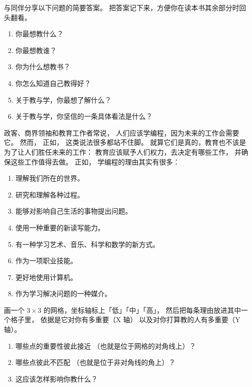 
与同伴分享以下问题的简要答案。
把答案记下来，方便你在读本书其余部分时回头翻看。

\begin{enumerate}

\item
  你最想教什么？

\item
  你最想教谁？

\item
  你为什么想教书？

\item
  你怎么知道自己教得好？

\item
  关于教与学，你最想了解什么？

\item
  关于教与学，你坚信的一条具体看法是什么？

\end{enumerate}


政客、商界领袖和教育工作者常说，
人们应该学编程，因为未来的工作会需要它。
然而，
正如，
这类说法很多都站不住脚。
就算它们是真的，教育也不该是为了让人们胜任未来的工作：
教育应该赋予人们权力，去决定有哪些工作，
并确保这些工作值得去做。
正如，
学编程的理由其实有很多：

\begin{enumerate}

\item
  理解我们所在的世界。

\item
  研究和理解各种过程。

\item
  能够对影响自己生活的事物提出问题。

\item
  使用一种重要的新读写能力。

\item
  有一种学习艺术、音乐、科学和数学的新方式。

\item
  作为一项职业技能。

\item
  更好地使用计算机。

\item
  作为学习解决问题的一种媒介。

\end{enumerate}

画一个 $3{\times}3$ 的网格，坐标轴标上「低」「中」「高」，
然后把每条理由放进其中一个格子里，
依据是它对你有多重要（X 轴）
以及对你打算教的人有多重要（Y 轴）。

\begin{enumerate}

\item
  哪些点的重要性彼此接近
  （也就是位于网格的对角线上）？

\item
  哪些点彼此不匹配
  （也就是位于非对角线的角上）？

\item
  这应该怎样影响你教什么？

\end{enumerate}
